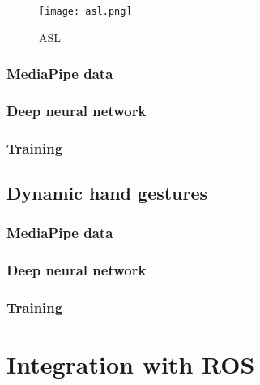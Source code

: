 \documentclass[../thesis.tex]{subfiles}
\begin{document}
\begin{figure}
    \centering
    \texttt{[image: asl.png]}
    \caption{\glsdesc{ASL}~\parencite{img:asl}}\label{fig:asl}
\end{figure}

\subsubsection{MediaPipe data}

\subsubsection{Deep neural network}

\subsubsection{Training}

\subsection{Dynamic hand gestures}

\subsubsection{MediaPipe data}

\subsubsection{Deep neural network}

\subsubsection{Training}

\section{Integration with ROS}
\end{document}
